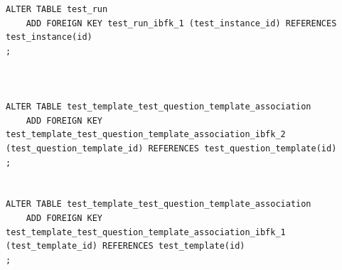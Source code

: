 \documentclass{article}
\begin{document}
\begin{lstlisting}
ALTER TABLE test_run
	ADD FOREIGN KEY test_run_ibfk_1 (test_instance_id) REFERENCES test_instance(id)
;



ALTER TABLE test_template_test_question_template_association
	ADD FOREIGN KEY test_template_test_question_template_association_ibfk_2 (test_question_template_id) REFERENCES test_question_template(id)
;


ALTER TABLE test_template_test_question_template_association
	ADD FOREIGN KEY test_template_test_question_template_association_ibfk_1 (test_template_id) REFERENCES test_template(id)
;



\end{lstlisting}
\end{document}
